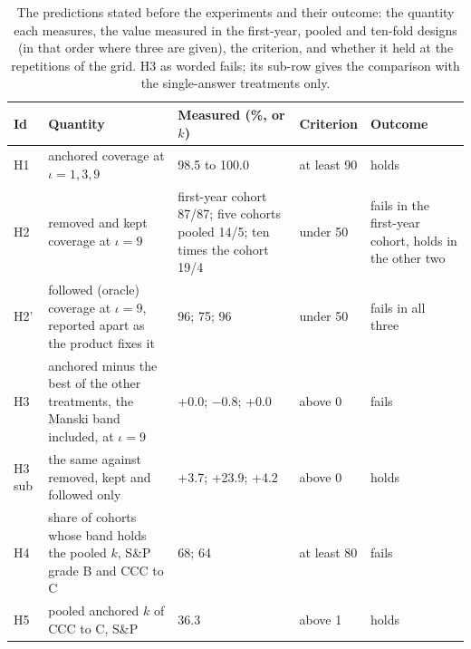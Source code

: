\begin{table}[htbp]
\centering
\small
\caption{The predictions stated before the experiments and their outcome: the quantity each measures, the value measured in the first-year, pooled and ten-fold designs (in that order where three are given), the criterion, and whether it held at the repetitions of the grid. H3 as worded fails; its sub-row gives the comparison with the single-answer treatments only.}
\label{tab:hypotheses}
\begin{tabular}{lp{4.4cm}p{4.2cm}p{1.6cm}p{2.8cm}}
\toprule
Id & Quantity & Measured (\%, or $k$) & Criterion & Outcome \\
\midrule
H1 & \relax anchored coverage at $\iota=1,3,9$ & 98.5 to 100.0 & at least 90 & holds \\
H2 & \relax removed and kept coverage at $\iota=9$ & first-year cohort 87/87; five cohorts pooled 14/5; ten times the cohort 19/4 & under 50 & fails in the first-year cohort, holds in the other two \\
H2' & \relax followed (oracle) coverage at $\iota=9$, reported apart as the product fixes it & 96; 75; 96 & under 50 & fails in all three \\
H3 & \relax anchored minus the best of the other treatments, the Manski band included, at $\iota=9$ & \relax +0.0; $-$0.8; +0.0 & above 0 & fails \\
H3 sub & the same against removed, kept and followed only & +3.7; +23.9; +4.2 & above 0 & holds \\
H4 & \relax share of cohorts whose band holds the pooled $k$, S\&P grade B and CCC to C & 68; 64 & at least 80 & fails \\
H5 & \relax pooled anchored $k$ of CCC to C, S\&P & 36.3 & above 1 & holds \\
\bottomrule
\end{tabular}
\end{table}
